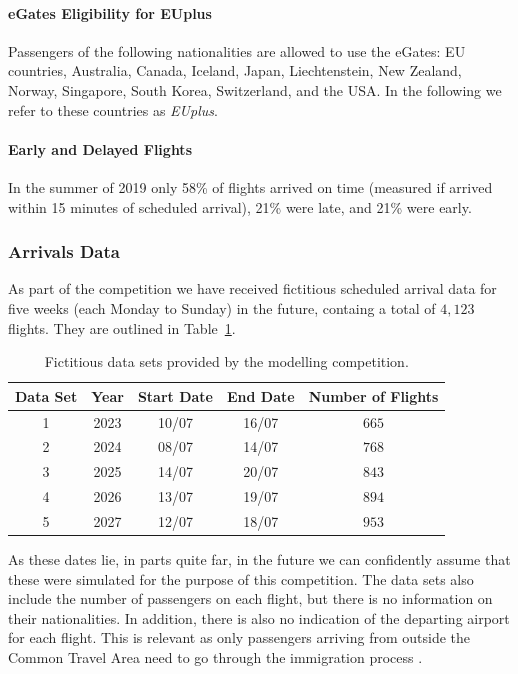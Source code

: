 \documentclass[10pt]{article}
\begin{document}
\paragraph{eGates Eligibility for EUplus}
Passengers of the following nationalities are allowed to use the eGates: EU countries, Australia, Canada, Iceland, Japan, Liechtenstein, New Zealand, Norway, Singapore, South Korea, Switzerland, and the USA. In the following we refer to these countries as \textit{EUplus}. 

\paragraph{Early and Delayed Flights}
In the summer of 2019 only 58\% of flights arrived on time (measured if arrived within 15 minutes of scheduled arrival), 21\% were late, and 21\% were early. 

\subsubsection{Arrivals Data}
As part of the competition we have received fictitious scheduled arrival data for five weeks (each Monday to Sunday) in the future, containg a total of $4,123$ flights. They are outlined in Table~\ref{tab_comdat_overview}.


\begin{table}[!ht]
\caption{Fictitious data sets provided by the modelling competition.}
\label{tab_comdat_overview}
\centering
\begin{tabular}{ccccc}
\hline
\multicolumn{1}{c}{\textbf{Data Set}} & \textbf{Year} & \textbf{Start Date} & \textbf{End Date} & \textbf{Number of Flights} \\ \hline
1  & 2023  & 10/07  & 16/07     & $665$   \\
2  & 2024  & 08/07  & 14/07     & $768$   \\
3  & 2025  & 14/07  & 20/07     & $843$   \\
4  & 2026  & 13/07  & 19/07     & $894$   \\
5  & 2027  & 12/07  & 18/07     & $953$   \\ \hline
\end{tabular}
\end{table}

As these dates lie, in parts quite far, in the future we can confidently assume that these were simulated for the purpose of this competition. The data sets also include the number of passengers on each flight, but there is no information on their nationalities. In addition, there is also no indication of the departing airport for each flight. This is relevant as only passengers arriving from outside the Common Travel Area need to go through the immigration process \cite{common_travel_area}.
\end{document}
